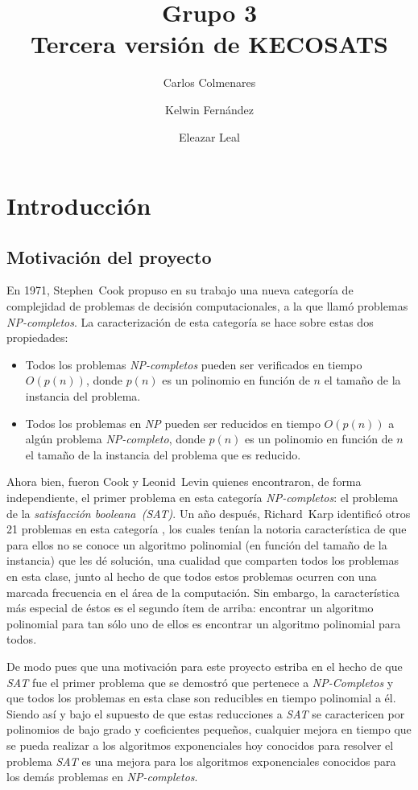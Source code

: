 \documentclass[12pt,lettersize,oneside]{article}
\title{Grupo 3 \\Tercera versión de KECOSATS}
\author{Carlos Colmenares \and Kelwin Fernández \and Eleazar Leal}
\begin{document}
\maketitle
\setlength{\parskip}{2.5mm}
\setlength{\itemsep}{0ex }
\section{Introducción}

\subsection{Motivación del proyecto}
En 1971, Stephen~Cook propuso en su trabajo\cite{Cook} una nueva categoría de
complejidad de problemas de decisión computacionales, a la que llamó problemas
\emph{NP-completos}. La caracterización de esta categoría se hace sobre estas
dos propiedades:
\begin{itemize}
  \item Todos los problemas \emph{NP-completos} pueden ser verificados en tiempo
    $O(p(n))$, donde $p(n)$ es un polinomio en función de $n$ el tamaño de la
    instancia del problema. 
  \item Todos los problemas en \emph{NP} pueden ser reducidos en tiempo
    $O(p(n))$ a algún problema \emph{NP-completo}, donde $p(n)$ es un polinomio
    en función de $n$ el tamaño de la instancia del problema que es reducido.
\end{itemize}

Ahora bien, fueron Cook y Leonid~Levin quienes encontraron, de forma
independiente, el primer problema en esta categoría \emph{NP-completos}: el
problema de la \emph{satisfacción booleana~(SAT)}. Un año después, Richard~Karp
identificó otros 21 problemas en esta categoría \cite{Karp}, los cuales tenían
la notoria característica de que para ellos no se conoce un algoritmo polinomial
(en función del tamaño de la instancia) que les dé solución, una cualidad que
comparten todos los problemas en esta clase, junto al hecho de que todos estos
problemas ocurren con una marcada frecuencia en el área de la computación. Sin
embargo, la característica más especial de éstos es el segundo ítem de arriba:
encontrar un algoritmo polinomial para tan sólo uno de ellos es encontrar un
algoritmo polinomial para todos.

De modo pues que una motivación para este proyecto estriba en el hecho de que
\emph{SAT} fue el primer problema que se demostró que pertenece a
\emph{NP-Completos} y que todos los problemas en esta clase son reducibles en
tiempo polinomial a él. Siendo así y bajo el supuesto de que estas reducciones a
\emph{SAT} se caractericen por polinomios de bajo grado y coeficientes pequeños,
cualquier mejora en tiempo que se pueda realizar a los algoritmos exponenciales
hoy conocidos para resolver el problema \emph{SAT} es una mejora para los
algoritmos exponenciales conocidos para los demás problemas en
\emph{NP-completos}.
\end{document}
